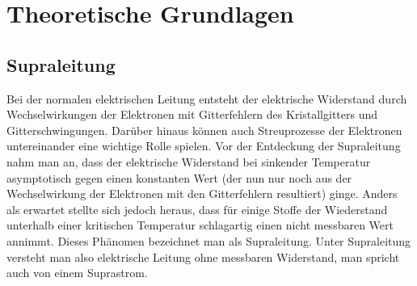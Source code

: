 \documentclass[12pt]{article}
\begin{document}
\section{Theoretische Grundlagen}
\subsection{Supraleitung}
Bei der normalen elektrischen Leitung entsteht der elektrische Widerstand durch Wechselwirkungen der Elektronen mit Gitterfehlern des Kristallgitters und Gitterschwingungen. Darüber hinaus können auch Streuprozesse der Elektronen untereinander eine wichtige Rolle spielen. Vor der  Entdeckung der Supraleitung nahm man an, dass der elektrische Widerstand bei sinkender Temperatur asymptotisch gegen einen konstanten Wert (der nun nur noch aus der Wechselwirkung der Elektronen mit den Gitterfehlern resultiert) ginge. Anders als erwartet stellte sich jedoch heraus, dass für einige Stoffe der Wiederstand unterhalb einer kritischen Temperatur schlagartig einen nicht messbaren Wert annimmt. Dieses Phänomen bezeichnet man als Supraleitung. Unter Supraleitung versteht man also elektrische Leitung ohne messbaren Widerstand, man spricht auch von einem Suprastrom. \\
\end{document}
